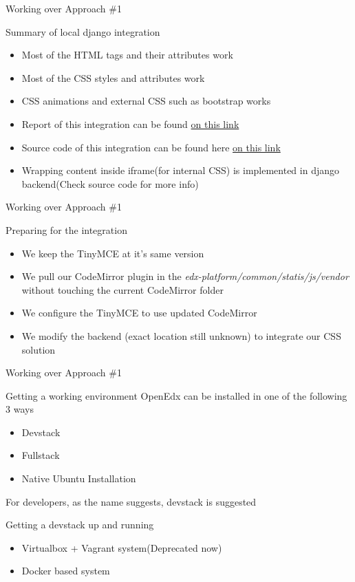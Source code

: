 \documentclass{beamer}
\begin{document}
	\begin{frame}{Working over Approach \#1}
		\begin{block}{Summary of local django integration}
			\begin{itemize}
				\item Most of the HTML tags and their attributes work
				\item Most of the CSS styles and attributes work
				\item CSS animations and external CSS such as bootstrap works
				\item Report of this integration can be found \alert{\hyperlink{Google Drive Link}{on this link}}
				\item Source code of this integration can be found here \alert{\hyperlink{GitHub Link}{on this link}}
				\item Wrapping content inside iframe(for internal CSS) is implemented in django backend(Check source code for more info)
			\end{itemize}
		\end{block}
	\end{frame}
	
	\begin{frame}{Working over Approach \#1}
		\begin{block}{Preparing for the integration}
			\begin{itemize}
				\item We keep the TinyMCE at it's same version
				\item We pull our CodeMirror plugin in the \textit{edx-platform/common/statis/js/vendor} \alert{without touching the current CodeMirror folder}
				\item We configure the TinyMCE to use updated CodeMirror
				\item We modify the backend (exact location still unknown) to integrate our CSS solution
			\end{itemize}
		\end{block}
	\end{frame}
	
	\begin{frame}{Working over Approach \#1}
		\begin{block}{Getting a working environment}
			OpenEdx can be installed in one of the following 3 ways
			\begin{itemize}
				\item Devstack
				\item Fullstack
				\item Native Ubuntu Installation
			\end{itemize}
			For developers, as the name suggests, devstack is suggested
		\end{block}
		\begin{block}{Getting a devstack up and running}
			\begin{itemize}
				\item Virtualbox + Vagrant system(Deprecated now)
				\item Docker based system
			\end{itemize}		
		\end{block}
	\end{frame}
	
\end{document}
